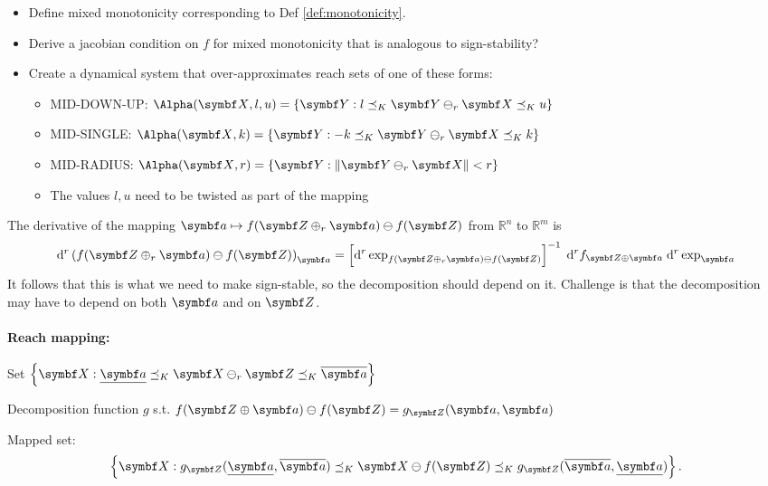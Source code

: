 \begin{itemize}
  \item Define mixed monotonicity corresponding to Def \eqref{def:monotonicity}.
  \item Derive a jacobian condition on $f$ for mixed monotonicity that is analogous to sign-stability?
  \item Create a dynamical system that over-approximates reach sets of one of these forms:
        \begin{itemize}
          \item MID-DOWN-UP: $\Alpha(\X, l, u) = \{ \Y : l \preceq_K \Y \ominus_r \X \preceq_K u \}$
          \item MID-SINGLE: $\Alpha(\X, k) = \{ \Y : -k \preceq_K \Y \ominus_r \X \preceq_K k \}$
          \item MID-RADIUS: $\Alpha(\X, r) = \{ \Y : \| \Y \ominus_r \X \| < r \}$
          \item The values $l, u$ need to be twisted as part of the mapping
        \end{itemize}
\end{itemize}

The derivative of the mapping $\a \mapsto f(\Z \oplus_r \a) \ominus f(\Z)$ from $\mathbb{R}^n$ to $\mathbb{R}^m$ is
\begin{equation}
  \mathrm{d}^r \left( f(\Z \oplus_r \a) \ominus f(\Z) \right)_\a = \left[ \mathrm{d}^r \exp_{f(\Z \oplus_r \a) \ominus f(\Z)} \right]^{-1} \; \mathrm{d}^r f_{\Z \oplus \a} \; \mathrm{d}^r \exp_\a
\end{equation}
It follows that this is what we need to make sign-stable, so the decomposition should depend on it. Challenge is that the decomposition may have to depend on both $\a$ and on $\Z$.

\paragraph{Reach mapping:}

Set $\left\{ \X : \underline \a \preceq_K \X \ominus_r \Z \preceq_K \overline \a \right\}$

Decomposition function $g$ s.t. $f(\Z \oplus \a) \ominus f(\Z) = g_{\Z}(\a, \a)$

Mapped set:
\begin{equation}
  \left\{ \X : g_\Z(\underline \a, \overline \a) \preceq_K \X \ominus f(\Z) \preceq_K g_\Z(\overline \a, \underline \a) \right\}.
\end{equation}

